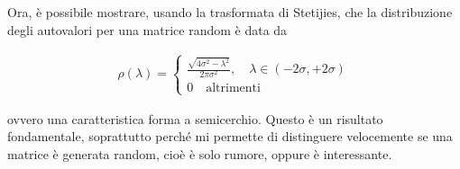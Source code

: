 \documentclass{report}
\begin{document}
Ora, è possibile mostrare, usando la trasformata di Stetijies, che la distribuzione degli autovalori per una matrice random è data da 

\begin{align}
    \rho(\lambda) = \begin{cases}
        \frac{\sqrt{4\sigma^2 - \lambda^2}}{2\pi \sigma^2}, \quad \lambda \in (-2\sigma, +2\sigma) \\
        0 \quad \text{altrimenti}
    \end{cases}
\end{align}

ovvero una caratteristica forma a semicerchio. Questo è un risultato fondamentale, soprattutto perché mi permette di distinguere velocemente se una matrice è generata random, cioè è solo rumore, oppure è interessante. 
\end{document}

